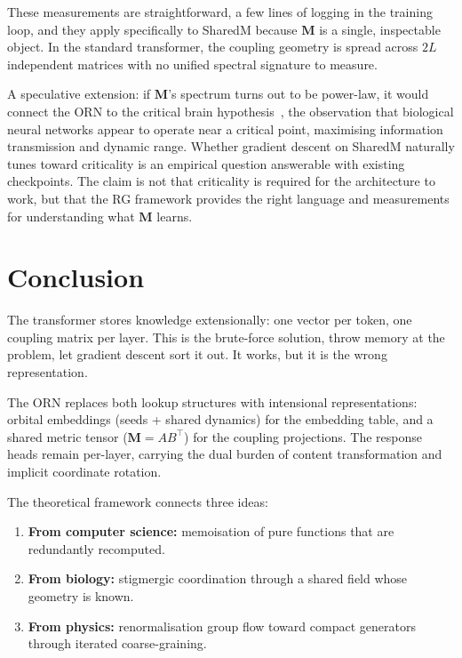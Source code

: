 \documentclass[11pt, a4paper]{article}
\newcommand{\M}{\mathbf{M}}
\theoremstyle{remark}
\begin{document}
These measurements are straightforward, a few lines of logging in the training loop, and they apply specifically to SharedM because $\M$ is a single, inspectable object.
In the standard transformer, the coupling geometry is spread across $2L$ independent matrices with no unified spectral signature to measure.

A speculative extension: if $\M$'s spectrum turns out to be power-law, it would connect the ORN to the critical brain hypothesis~\cite{beggs2003neuronal}, the observation that biological neural networks appear to operate near a critical point, maximising information transmission and dynamic range.
Whether gradient descent on SharedM naturally tunes toward criticality is an empirical question answerable with existing checkpoints.
The claim is not that criticality is required for the architecture to work, but that the RG framework provides the right language and measurements for understanding what $\M$ learns.


\section{Conclusion}
\label{sec:conclusion}

The transformer stores knowledge extensionally: one vector per token, one coupling matrix per layer.
This is the brute-force solution, throw memory at the problem, let gradient descent sort it out.
It works, but it is the wrong representation.

The ORN replaces both lookup structures with intensional representations: orbital embeddings (seeds + shared dynamics) for the embedding table, and a shared metric tensor ($\M = AB^\top$) for the coupling projections.
The response heads remain per-layer, carrying the dual burden of content transformation and implicit coordinate rotation.

The theoretical framework connects three ideas:
\begin{enumerate}[nosep]
    \item \textbf{From computer science:} memoisation of pure functions that are redundantly recomputed.
    \item \textbf{From biology:} stigmergic coordination through a shared field whose geometry is known.
    \item \textbf{From physics:} renormalisation group flow toward compact generators through iterated coarse-graining.
\end{enumerate}
\end{document}
